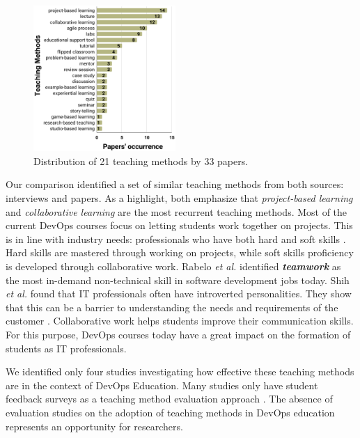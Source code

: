 \documentclass[10pt,conference]{IEEEtran}
\begin{document}
\begin{figure}[ht]
 \centering
  \includegraphics[width=0.48\textwidth]{fig/rslResults.pdf}
  \caption{Distribution of 21 teaching methods by 33 papers.}
  \label{fig:rslResults}
\end{figure}    

Our comparison identified a set of similar teaching methods from both sources: interviews and papers. As a highlight, both emphasize that \textsl{project-based learning} and \textsl{collaborative learning} are the most recurrent teaching methods. Most of the current DevOps courses focus on letting students work together on projects. This is in line with industry needs: professionals who have both hard and soft skills \cite{rabelo:2022}. Hard skills are mastered through working on projects, while soft skills proficiency is developed through collaborative work. Rabelo \textit{et al.} \cite{rabelo:2022}  identified \textbf{\textit{teamwork}} as the most in-demand non-technical skill in software development jobs today. Shih \textit{et al.} \cite{shih:2014} found that IT professionals often have introverted personalities. They show that this can be a barrier to understanding the needs and requirements of the customer \cite{rabelo:2022}. Collaborative work helps students improve their communication skills. For this purpose, DevOps courses today have a great impact on the formation of students as IT professionals. 


We identified only four studies \cite{eddy:2017_pp, perez:2021_pp, abirami:2021_pp, okolica:2020_pp} investigating how effective these teaching methods are in the context of DevOps Education. Many studies only have student feedback surveys as a teaching method evaluation approach \cite{christensen:2018_pp, kuusinen:2019_pp, krusche:2014_pp, christensen:2016_pp, bobrov:2019_pp, alves:2021_pp, mirhosseini:2019_pp, kousa:2020_pp, rahman:2021_pp, hills:2020_pp}. The absence of evaluation studies on the adoption of teaching methods in DevOps education represents an opportunity for researchers.
\end{document}
